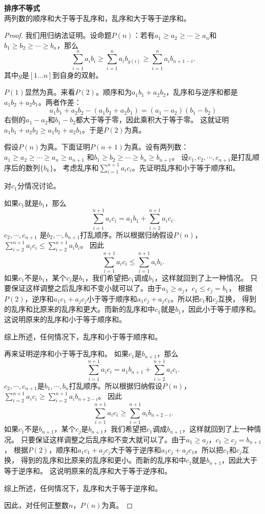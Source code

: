\documentclass[12pt,UTF8]{ctexbook}
\begin{document}
\begin{tm}\textbf{排序不等式}\\
    两列数的顺序和大于等于乱序和，乱序和大于等于逆序和。
\end{tm}
\begin{proof}
    我们用归纳法证明。设命题$P(n)$：若有$a_1 \geqslant a_2 \geqslant \cdots \geqslant a_n$和
    $b_1 \geqslant b_2 \geqslant \cdots \geqslant b_n$，那么
    $$ \sum_{i=1}^n a_ib_i \geqslant \sum_{i=1}^n a_ib_{g(i)} \geqslant \sum_{i=1}^n a_ib_{n+1-i} . $$
    其中$g$是$[1\dots n]$到自身的双射。

    $P(1)$显然为真。来看$P(2)$。顺序和为$a_1b_1 + a_2b_2$，乱序和与逆序和都是$a_1b_2 + a_2b_1$。两者作差：
    $$ a_1b_1 + a_2b_2 - (a_1b_2 + a_2b_1) = (a_1 - a_2)(b_1 - b_2) $$
    右侧的$a_1-a_2$和$b_1-b_2$都大于等于零，因此乘积大于等于零。
    这就证明$a_1b_1 + a_2b_2 \geqslant a_1b_2 + a_2b_1$。于是$P(2)$为真。

    假设$P(n)$为真。下面证明$P(n+1)$为真。设有两列数：
    $a_1 \geqslant a_2 \geqslant \cdots \geqslant a_n\geqslant a_{n+1}$
    和$b_1 \geqslant b_2 \geqslant \cdots \geqslant b_n \geqslant b_{n+1}$。
    设$c_1, c_2, \cdots , c_{n+1}$是打乱顺序后的数列$\{b_k\}$。
    考虑乱序和$\sum_{i=1}^{n+1} a_i c_i$。先证明乱序和小于等于顺序和。

    对$c_{1}$分情况讨论。

    如果$c_1$就是$b_1$，那么
    $$\sum_{i=1}^{n+1} a_i c_i = a_1b_1 + \sum_{i=2}^{n+1} a_i c_i.$$
    $c_2, \cdots, c_{n+1}$
    是$b_2, \cdots, b_{n+1}$打乱顺序。所以根据归纳假设$P(n)$，
    $\sum_{i=2}^{n+1} a_i c_i \leqslant \sum_{i=2}^{n+1} a_i b_i$。
    因此
    $$\sum_{i=1}^{n+1} a_i c_i \leqslant \sum_{i=1}^{n+1} a_i b_i.$$
    如果$c_1$不是$b_1$，某个$c_j$是$b_1$，我们希望把$c_1$调成$b_1$，这样就回到了上一种情况。
    只要保证这样调整之后乱序和不变小就可以了。由于$a_1 \geqslant a_j$，$c_1 \leqslant c_j = b_1$，
    根据$P(2)$，逆序和$a_1c_1 + a_jc_j$小于等于顺序和$a_1c_j + a_jc_1$。所以把$c_1$和$c_j$互换，
    得到的乱序和比原来的乱序和更大。而新的乱序和中$c_1$就是$b_1$，因此小于等于顺序和。
    这说明原来的乱序和小于等于顺序和。

    综上所述，任何情况下，乱序和小于等于顺序和。

    再来证明逆序和小于等于乱序和。
    如果$c_1$是$b_{n+1}$，那么
    $$\sum_{i=1}^{n+1} a_i c_i = a_1b_{n+1} + \sum_{i=2}^{n+1} a_i c_i.$$
    $c_2, \cdots, c_{n+1}$是$b_1, \cdots, b_{n}$打乱顺序。所以根据归纳假设$P(n)$，
    $\sum_{i=2}^{n+1} a_i c_i \geqslant \sum_{i=2}^{n+1} a_i b_{n+2-i}$。
    因此
    $$\sum_{i=1}^{n+1} a_i c_i \geqslant \sum_{i=1}^{n+1} a_i b_{n+2-i}.$$
    如果$c_1$不是$b_{n+1}$，某个$c_j$是$b_{n+1}$，我们希望把$c_1$调成$b_{n+1}$，这样就回到了上一种情况。
    只要保证这样调整之后乱序和不变大就可以了。由于$a_1 \geqslant a_j$，$c_1 \geqslant c_j = b_{n+1}$，
    根据$P(2)$，顺序和$a_1c_1 + a_jc_j$大于等于逆序和$a_1c_j + a_jc_1$。所以把$c_1$和$c_j$互换，
    得到的乱序和比原来的乱序和更小。而新的乱序和中$c_1$就是$b_{n+1}$，因此大于等于逆序和。
    这说明原来的乱序和大于等于逆序和。

    综上所述，任何情况下，乱序和大于等于逆序和。
    
    因此，对任何正整数$n$，$P(n)$为真。
\end{proof}
\end{document}
